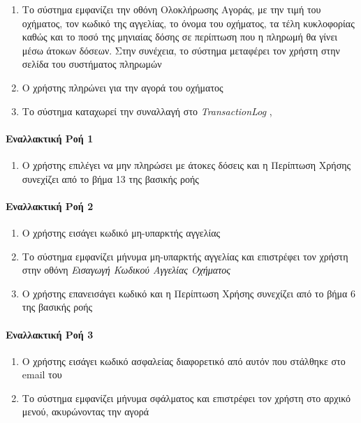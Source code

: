 \documentclass{../ol-softwaremanual}
\begin{document}
\begin{enumerate}
		\item Το σύστημα εμφανίζει την οθόνη Ολοκλήρωσης Αγοράς, με την τιμή του οχήματος, τον κωδικό της αγγελίας, το όνομα του οχήματος, τα τέλη κυκλοφορίας καθώς και το ποσό της μηνιαίας δόσης σε περίπτωση που η πληρωμή θα γίνει μέσω άτοκων δόσεων. Στην συνέχεια, το σύστημα μεταφέρει τον χρήστη στην σελίδα του συστήματος πληρωμών
		\item Ο χρήστης πληρώνει για την αγορά του οχήματος
		\item Το σύστημα καταχωρεί την συναλλαγή στο \en \textit{TransactionLog} \gr, 
	\end{enumerate}
	
	\paragraph{Εναλλακτική Ροή 1}
	\begin{enumerate}
		\item Ο χρήστης επιλέγει να μην πληρώσει με άτοκες δόσεις και η Περίπτωση Χρήσης συνεχίζει από το βήμα 13 της βασικής ροής
	\end{enumerate}
	
	\paragraph{Εναλλακτική Ροή 2}
	\begin{enumerate}
		\item Ο χρήστης εισάγει κωδικό μη-υπαρκτής αγγελίας
		\item Το σύστημα εμφανίζει μήνυμα μη-υπαρκτής αγγελίας και επιστρέφει τον χρήστη στην οθόνη \textit{Εισαγωγή Κωδικού Αγγελίας Οχήματος} 
		\item Ο χρήστης επανεισάγει κωδικό και η Περίπτωση Χρήσης συνεχίζει από το βήμα 6 της βασικής ροής
	\end{enumerate}
	
	\paragraph{Εναλλακτική Ροή 3}
	\begin{enumerate}
		\item Ο χρήστης εισάγει κωδικό ασφαλείας διαφορετικό από αυτόν που στάλθηκε στο \en email \gr του
		\item Το σύστημα εμφανίζει μήνυμα σφάλματος και επιστρέφει τον χρήστη στο αρχικό μενού, ακυρώνοντας την αγορά
	\end{enumerate}
	
\end{document}
